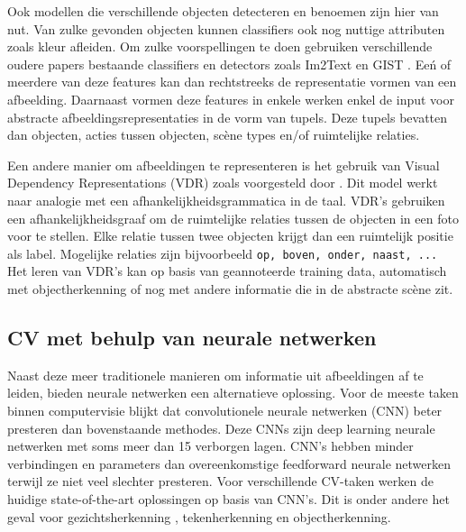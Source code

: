 Ook modellen die verschillende objecten detecteren en benoemen zijn hier van nut. Van zulke gevonden objecten kunnen classifiers ook nog nuttige attributen zoals kleur afleiden. Om zulke voorspellingen te doen gebruiken verschillende oudere papers bestaande classifiers en detectors zoals \cite{Felzenszwalb2008} Im2Text \cite{Ordonez2011} en GIST \cite{Oliva2006}. Ee\'n of meerdere van deze features kan dan rechtstreeks de representatie vormen van een afbeelding. Daarnaast vormen deze features in enkele werken \cite{Farhadi2010,Yang2011,Li2011,Mitchell2012} enkel de input voor abstracte afbeeldingsrepresentaties in de vorm van tupels. Deze tupels bevatten dan objecten, acties tussen objecten, sc\`ene types en/of ruimtelijke relaties.

Een andere manier om afbeeldingen te representeren is het gebruik van Visual Dependency Representations (VDR) zoals voorgesteld door \cite{Elliott2013}. Dit model werkt naar analogie met een afhankelijkheidsgrammatica in de taal. VDR's gebruiken een afhankelijkheidsgraaf om de ruimtelijke relaties tussen de objecten in een foto voor te stellen. Elke relatie tussen twee objecten krijgt dan een ruimtelijk positie als label. Mogelijke relaties zijn bijvoorbeeld \texttt{op, boven, onder, naast, ...} Het leren van VDR's kan op basis van geannoteerde training data, automatisch met objectherkenning \cite{Elliott2015} of nog met andere informatie die in de abstracte sc\`ene zit. \cite{Gilberto2015} 

\subsection{CV met behulp van neurale netwerken}
Naast deze meer traditionele manieren om informatie uit afbeeldingen af te leiden, bieden neurale netwerken een alternatieve oplossing.
Voor de meeste taken binnen computervisie blijkt dat convolutionele neurale netwerken (CNN) beter presteren dan bovenstaande methodes. Deze CNNs zijn deep learning neurale netwerken met soms meer dan 15 verborgen lagen. CNN's hebben minder verbindingen en parameters dan overeenkomstige feedforward neurale netwerken terwijl ze niet veel slechter presteren.\cite{Krizhevsky2012} 
Voor verschillende CV-taken werken de huidige state-of-the-art oplossingen op basis van CNN's. Dit is onder andere het geval voor gezichtsherkenning \cite{Zhou2015}, tekenherkenning \cite{Ciresan2012} en objectherkenning\cite{Szegedy2014}.

